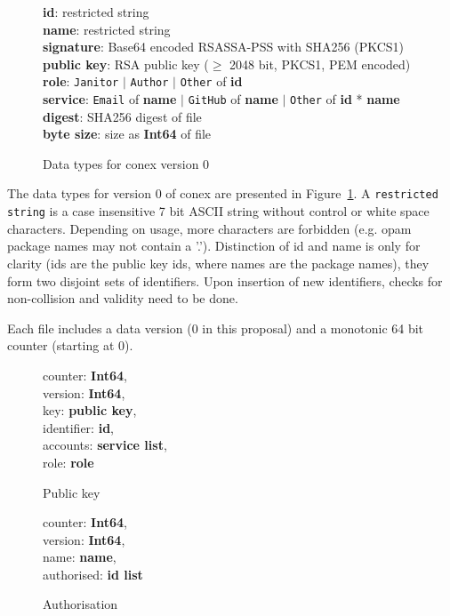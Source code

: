 \documentclass[nocopyrightspace]{sigplanconf}
\begin{document}
\begin{figure}[h]
\textbf{id}: restricted string\\
\textbf{name}: restricted string\\
\textbf{signature}: Base64 encoded RSASSA-PSS with SHA256 (PKCS1)\\
\textbf{public key}: RSA public key ($\geq$ 2048 bit, PKCS1, PEM encoded)\\
\textbf{role}: \texttt{Janitor} $|$ \texttt{Author} $|$ \texttt{Other} of \textbf{id}\\
\textbf{service}: \texttt{Email} of \textbf{name} $|$ \texttt{GitHub} of \textbf{name} $|$ \texttt{Other} of \textbf{id} * \textbf{name}\\
\textbf{digest}: SHA256 digest of file\\
\textbf{byte size}: size as \textbf{Int64} of file
\caption{\label{fig:datatypes0}
  Data types for conex version 0}
\end{figure}

The data types for version 0 of conex are presented in Figure~\ref{fig:datatypes0}.
A \texttt{restricted string} is a case insensitive 7 bit ASCII string without control or white space characters.
Depending on usage, more characters are forbidden (e.g. opam package names may not contain a '.').
Distinction of id and name is only for clarity (ids are the public key ids, where names are the package names), they form two disjoint sets of identifiers.
Upon insertion of new identifiers, checks for non-collision and validity need to be done.

Each file includes a data version (0 in this proposal) and a monotonic 64 bit counter (starting at 0).

\begin{figure}[h]
  \begin{minipage}{\hsize}
    \begin{minipage}{.4 \hsize}
counter: \textbf{Int64},\\
version: \textbf{Int64},\\
key: \textbf{public key},\\
identifier: \textbf{id},\\
accounts: \textbf{service list},\\
role: \textbf{role}
 \caption{\label{fig:keyformat} Public key}
    \end{minipage}
    \hspace*{.5cm}
    \begin{minipage}{.4 \hsize}
counter: \textbf{Int64},\\
version: \textbf{Int64},\\
name: \textbf{name},\\
authorised: \textbf{id list}
 \caption{\label{fig:authformat} Authorisation}
    \end{minipage}
  \end{minipage}
\end{figure}
\end{document}

